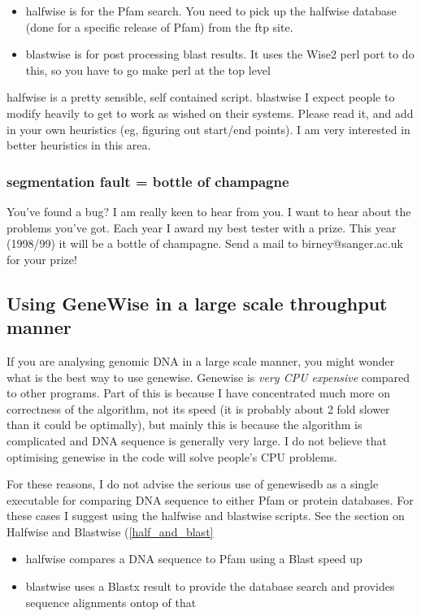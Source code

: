 \documentclass{article}
\begin{document}
\begin{itemize}
\item halfwise is for the Pfam search. You need to pick up the halfwise
database (done for a specific release of Pfam) from the ftp site.
\item blastwise is for post processing blast results. It uses the Wise2
perl port to do this, so you have to go make perl at the top level
\end{itemize}

halfwise is a pretty sensible, self contained script. blastwise I expect
people to modify heavily to get to work as wished on their systems. Please
read it, and add in your own heuristics (eg, figuring out start/end points).
I am very interested in better heuristics in this area.

\subsubsection{segmentation fault = bottle of champagne}

You've found a bug? I am really keen to hear from you. I want
to hear about the problems you've got. Each year I award my
best tester with a prize. This year (1998/99) it will be
a bottle of champagne. Send a mail to birney@sanger.ac.uk
for your prize!

\subsection{Using GeneWise in a large scale throughput manner}
\label{genewise_large}

If you are analysing genomic DNA in a large scale manner, you might
wonder what is the best way to use genewise. Genewise is \emph{very
CPU expensive} compared to other programs. Part of this is because 
I have concentrated much more on correctness of the algorithm, not
its speed (it is probably about 2 fold slower than it could be optimally),
but mainly this is because the algorithm is complicated and DNA sequence
is generally very large. I do not believe that optimising genewise in 
the code will solve people's CPU problems. 

For these reasons, I do not advise the serious use of genewisedb as
a single executable for comparing DNA sequence to either Pfam or
protein databases. For these cases I suggest using the halfwise and
blastwise scripts. See the section on Halfwise and Blastwise (\ref{half_and_blast}

\begin{itemize}
\item halfwise compares a DNA sequence to Pfam using a Blast speed up
\item blastwise uses a Blastx result to provide the database search
and provides sequence alignments ontop of that
\end{itemize}
\end{document}
